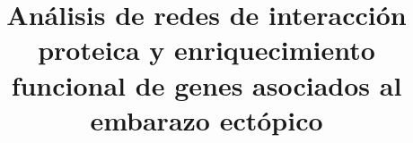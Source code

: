 \documentclass{bmcart}
\begin{document}
	\begin{frontmatter}
	
		\begin{fmbox}
			
			
			\title{Análisis de redes de interacción proteica y enriquecimiento funcional de genes asociados al embarazo ectópico}
			
			
			\author[
			  addressref={aff1},                   %
			  corref={aff1},                       %
			  email={laurasanchezw@gmail.com}   %
			]{ } %
			\author[
			  addressref={aff1},
			  email={johanaelesa@gmail.com}
			]{ }
			\author[
			addressref={aff1},
			email={sabriinael160@gmail.com}
			]{ }
			\author[
			addressref={aff1},
			email={salmaouariachi@gmail.com}
			]{ }
			
			
			\address[id=aff1]{%
			  ,             %
			  ,          %
			  ,                              %
			}
		
		\end{fmbox}%
		
		\begin{abstractbox}
		
			\begin{abstract} %
			
			

\end{abstract}
\end{abstractbox}
\end{frontmatter}
\end{document}
